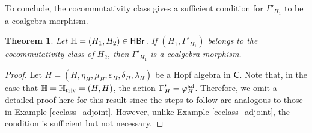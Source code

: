 \documentclass[11pt,reqno]{amsart}
\theoremstyle{plain}%
\newtheorem{theorem}{Theorem}[section]%
\theoremstyle{definition}
\theoremstyle{remark}
\begin{document}
To conclude, the cocommutativity class gives a sufficient condition for $\Gamma'_{H_{1}}$ to be a coalgebra morphism.
\begin{theorem}
	Let $\mathbb{H}=(H_{1},H_{2})\in{\sf HBr}$. If $(H_{1},\Gamma'_{H_{1}})$ belongs to the cocommutativity class of $H_{2}$, then $\Gamma'_{H_{1}}$ is a coalgebra morphism.
\end{theorem}
\begin{proof}
	Let $H=(H,\eta_{H},\mu_{H},\varepsilon_{H},\delta_{H},\lambda_{H})$ be a Hopf algebra in ${\sf C}$. Note that, in the case that $\mathbb{H}=\mathbb{H}_{{\rm triv}}=(H,H)$, the action $\Gamma'_{H}=\varphi_{H}^{{\rm ad}}$. Therefore, we omit a detailed proof here for this result since the steps to follow are analogous to those in Example \ref{ccclass_adjoint}. However, unlike Example \ref{ccclass_adjoint}, the condition is sufficient but not necessary.
\end{proof}
\end{document}
